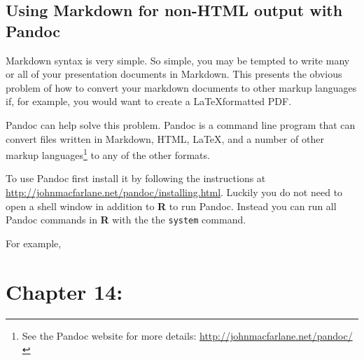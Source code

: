 \documentclass[ChapterTOCs,krantz1]{krantz}\usepackage{graphicx, color}
\begin{document}
\section{Using Markdown for non-HTML output with Pandoc}

Markdown syntax is very simple. So simple, you may be tempted to write many or all of your presentation documents in Markdown. This presents the obvious problem of how to convert your markdown documents to other markup languages if, for example, you would want to create a \LaTeX formatted PDF. 

Pandoc can help solve this problem. Pandoc is a command line program that can convert files written in Markdown, HTML, \LaTeX, and a number of other markup languages\footnote{See the Pandoc website for more details: {\url{http://johnmacfarlane.net/pandoc/}}} to any of the other formats. 

To use Pandoc first install it by following the instructions at {\url{http://johnmacfarlane.net/pandoc/installing.html}}. Luckily you do not need to open a shell window in addition to {\bf{R}} to run Pandoc. Instead you can run all Pandoc commands in {\bf{R}} with the the {\tt{system}} command. 

For example, 


  




\chapter{Chapter 14:}






\clearpage
\printindex
\end{document}

